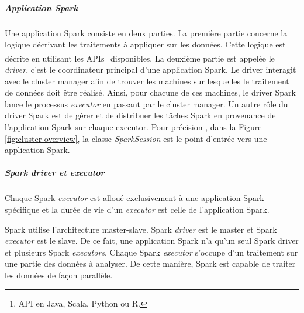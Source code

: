\subparagraph{Application Spark}
Une application Spark consiste en deux parties. La première partie concerne la logique décrivant les traitements à appliquer sur les données.  Cette logique est décrite en utilisant les APIs\footnote{API en Java, Scala, Python ou R.} disponibles. La deuxième partie est appelée le \textit{driver}, c'est le coordinateur principal d'une application Spark. Le driver interagit avec le cluster manager afin de trouver les machines sur lesquelles le traitement de données doit être réalisé. Ainsi, pour chacune de ces machines, le driver Spark lance le processus \textit{executor} en passant par le cluster manager. Un autre rôle du  driver Spark est de gérer et de distribuer les tâches Spark en provenance de l'application Spark sur chaque executor. Pour précision , dans la Figure \ref{fig:cluster-overview}, la classe \textit{SparkSession} est le point d'entrée vers une application Spark.

\subparagraph{Spark driver et executor}

Chaque Spark \textit{executor} est alloué exclusivement à une application Spark spécifique et la durée de vie d'un \textit{executor} est celle de l'application Spark. 

Spark utilise l'architecture master-slave. Spark \textit{driver} est le master et Spark \textit{executor} est le slave. De ce fait, une application Spark n'a qu'un seul Spark driver et plusieurs Spark \textit{executors}. Chaque Spark \textit{executor} s'occupe d'un traitement  sur une partie  des données à analyser. De cette manière,  Spark est capable de traiter  les données de façon parallèle. 


